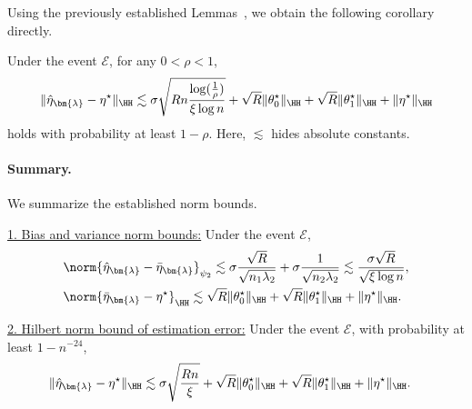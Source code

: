 \documentclass[12pt,a4paper,pdftex,onepage]{article}
\newcommand{\event}{\mathscr{E}}
\begin{document}
Using the previously established 
Lemmas~, 
we obtain the following corollary directly.


\begin{corollary}\label{corollary; Hilbert norm bound of estimators}
Under the event \(\event\), for any \(0<\rho <1\), 
\begin{align*}
\|\hat{\eta}_{\bm{\lambda}}-\eta^\star \|_{\HH} \lesssim \sigma  \sqrt{Rn\frac{\log(\frac{1}{\rho})}{\xi \log n}}+  \sqrt{R}\| \theta_0^\star\|_{\HH}+ \sqrt{R}\| \theta_1^\star\|_{\HH} + \|\eta^\star \|_{\HH}
\end{align*}
holds with probability at least \(1-\rho\).
Here, \(\lesssim\) hides absolute constants.
\end{corollary}

\paragraph{Summary. }\label{summary; summary norm bound}
We summarize the established norm bounds.

\underline{1. Bias and variance norm bounds:}\quad
Under the event \(\event\), 
\begin{align*}
&\norm{\hat{\eta}_{\bm{\lambda}}-{\bar{\eta}}_{\bm{\lambda}}}_{\psi_2} \lesssim \sigma\frac{\sqrt{R} }{\sqrt{n_1 \lambda_2}} + \sigma\frac{1}{\sqrt{n_2\lambda_2}} \lesssim \frac{\sigma  \sqrt{R}}{\sqrt{\xi \log n}},  \\
&\norm{\bar{\eta}_{\bm{\lambda}}-{{\eta^\star}}}_{\HH} \lesssim \sqrt{R}  \|\theta_0^\star\|_{\HH}+\sqrt{R} \|\theta_1^\star\|_{\HH}+\|\eta^\star\|_{\HH}.
\end{align*}

\underline{2. Hilbert norm bound of estimation error:}\quad
Under the event \(\event\), with probability at least \(1-n^{-24}\),
\begin{align*}
\|\hat{\eta}_{\bm{\lambda}}-\eta^\star \|_{\HH} &\lesssim \sigma \sqrt{\frac{Rn  }{\xi}}+\sqrt{R} \| \theta_0^\star\|_{\HH}+\sqrt{R}  \| \theta_1^\star\|_{\HH} +\| \eta^\star\|_{\HH}.
\end{align*}
\end{document}
